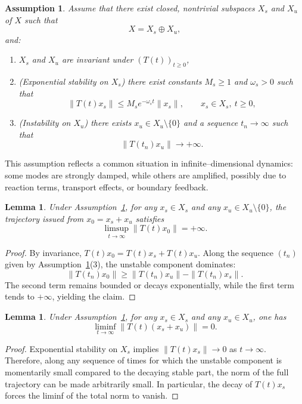 \documentclass[12pt]{article}
\newtheorem{lemma}[theorem]{Lemma}
\newtheorem{assumption}[theorem]{Assumption}
\begin{document}
\begin{assumption}\label{ass:splitting}
Assume that there exist closed, nontrivial subspaces $X_s$ and $X_u$ of $X$ such that
\[
X = X_s \oplus X_u,
\]
and:
\begin{enumerate}
\item $X_s$ and $X_u$ are invariant under $(T(t))_{t\ge 0}$,
\item (\emph{Exponential stability on $X_s$}) there exist constants
$M_s \ge 1$ and $\omega_s>0$ such that
\[
\|T(t)x_s\| \le M_s e^{-\omega_s t}\|x_s\|,
\qquad x_s\in X_s,\ t\ge 0,
\]
\item (\emph{Instability on $X_u$}) there exists $x_u\in X_u\setminus\{0\}$ and a sequence $t_n\to\infty$ such that
\[
\|T(t_n)x_u\| \longrightarrow +\infty .
\]
\end{enumerate}
\end{assumption}

This assumption reflects a common situation in infinite--dimensional dynamics: some modes are strongly damped, while others are amplified, possibly due to reaction terms, transport effects, or boundary feedback.

\begin{lemma}\label{lem:limsup}
Under Assumption~\ref{ass:splitting}, for any $x_s\in X_s$ and any
$x_u\in X_u\setminus\{0\}$, the trajectory issued from
$x_0=x_s+x_u$ satisfies
\[
\limsup_{t\to\infty}\|T(t)x_0\| = +\infty .
\]
\end{lemma}

\begin{proof}
By invariance, $T(t)x_0=T(t)x_s+T(t)x_u$. Along the sequence $(t_n)$ given by Assumption~\ref{ass:splitting}(3), the unstable component dominates:
\[
\|T(t_n)x_0\|
\ge \|T(t_n)x_u\| - \|T(t_n)x_s\|.
\]
The second term remains bounded or decays exponentially, while the first term tends to $+\infty$, yielding the claim.
\end{proof}

\begin{lemma}\label{lem:liminf}
Under Assumption~\ref{ass:splitting}, for any $x_s\in X_s$ and any $x_u\in X_u$,
one has
\[
\liminf_{t\to\infty}\|T(t)(x_s+x_u)\| = 0 .
\]
\end{lemma}

\begin{proof}
Exponential stability on $X_s$ implies $\|T(t)x_s\|\to 0$ as $t\to\infty$. Therefore, along any sequence of times for which the unstable component is momentarily small compared to the decaying stable part, the norm of the full trajectory can be made arbitrarily small. In particular, the decay of $T(t)x_s$ forces the liminf of the total norm to vanish.
\end{proof}
\end{document}
